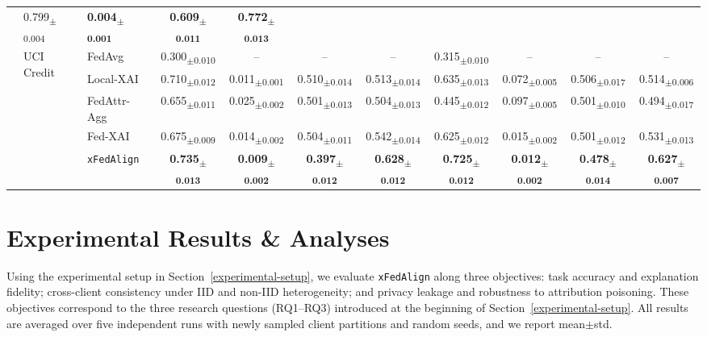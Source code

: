 \documentclass{article}
\newcommand{\meanstd}[2]{#1\textsubscript{\scriptsize$\pm$#2}}
\theoremstyle{plain}
\theoremstyle{definition}
\theoremstyle{remark}
\begin{document}
\begin{table}[t]
{\begin{tabular}{lllcccccccc}
      & \meanstd{0.799}{0.004} & \textbf{\meanstd{0.004}{0.001}} & \textbf{\meanstd{0.609}{0.011}} & \textbf{\meanstd{0.772}{0.013}} \\
      \arrayrulecolor{gray!60}
\cmidrule(lr){2-11}
\arrayrulecolor{black}
  & \multirow{5}{*}{\centering UCI Credit} 
    & FedAvg      
      & \meanstd{0.300}{0.010} & -- & -- & -- 
      & \meanstd{0.315}{0.010} & -- & -- & -- \\
  &  & Local-XAI      
      & \meanstd{0.710}{0.012} & \meanstd{0.011}{0.001} & \meanstd{0.510}{0.014} & \meanstd{0.513}{0.014}
      & \meanstd{0.635}{0.013} & \meanstd{0.072}{0.005} & \meanstd{0.506}{0.017} & \meanstd{0.514}{0.006} \\
  &  & FedAttr-Agg      
      & \meanstd{0.655}{0.011} & \meanstd{0.025}{0.002} & \meanstd{0.501}{0.013} & \meanstd{0.504}{0.013}
      & \meanstd{0.445}{0.012} & \meanstd{0.097}{0.005} & \meanstd{0.501}{0.010} & \meanstd{0.494}{0.017} \\
  &  & Fed-XAI      
      & \meanstd{0.675}{0.009} & \meanstd{0.014}{0.002} & \meanstd{0.504}{0.011} & \meanstd{0.542}{0.014}
      & \meanstd{0.625}{0.012} & \meanstd{0.015}{0.002} & \meanstd{0.501}{0.012} & \meanstd{0.531}{0.013} \\
  &  & \texttt{xFedAlign}      
      & \textbf{\meanstd{0.735}{0.013}} & \textbf{\meanstd{0.009}{0.002}} & \textbf{\meanstd{0.397}{0.012}} & \textbf{\meanstd{0.628}{0.012}}
      & \textbf{\meanstd{0.725}{0.012}} & \textbf{\meanstd{0.012}{0.002}} & \textbf{\meanstd{0.478}{0.014}} & \textbf{\meanstd{0.627}{0.007}} \\
\bottomrule
\end{tabular}
}%
\end{table}

\section{Experimental Results \& Analyses} \label{sec:results}

Using the experimental setup in Section~\ref{experimental-setup}, we evaluate \texttt{xFedAlign} along three objectives: task accuracy and explanation fidelity; cross-client consistency under IID and non-IID heterogeneity; and privacy leakage and robustness to attribution poisoning. These objectives correspond to the three research questions (RQ1--RQ3) introduced at the beginning of Section~\ref{experimental-setup}. All results are averaged over five independent runs with newly sampled client partitions and random seeds, and we report mean$\pm$std.
\end{document}
